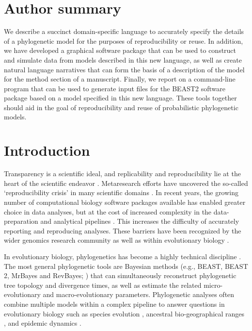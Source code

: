 \documentclass[10pt,letterpaper,table]{article}
\theoremstyle{definition}
\begin{document}
\section*{Author summary}
  We describe a succinct domain-specific language to accurately specify the details of a phylogenetic model for the purposes of reproducibility or reuse.
  In addition, we have developed a graphical software package that can be used to construct and simulate data from models described in this new language, as well as create natural language narratives that can form the basis of a description of the model for the method section of a manuscript.
  Finally, we report on a command-line program that can be used to generate input files for the BEAST2 software package based on a model specified in this new language.
  These tools together should aid in the goal of reproducibility and reuse of probabilistic phylogenetic models. 


\linenumbers

\section{Introduction}
Transparency is a scientific ideal, and replicability and
reproducibility lie at the heart of the scientific endeavor
\cite{nas19,munafo17}. 
Metaresearch efforts have uncovered the so-called `reproducibility
crisis' \cite{baker16} in many scientific domains \cite{baker16}. 
In recent years, the growing number of computational biology software packages available has enabled greater choice in data analyses, 
but at the cost of increased complexity in the data-preparation and analytical pipelines \cite{eren2021community}. 
This increases the difficulty of accurately reporting and reproducing analyses. 
These barriers have been recognized by the wider genomics research community \cite{eren2021community} as well as within evolutionary biology \cite{oakley2014osiris}. 

In evolutionary biology, phylogenetics has become a highly technical discipline \cite{oakley2014osiris}. 
The most general phylogenetic tools are Bayesian methods (e.g., BEAST, BEAST 2, MrBayes and
RevBayes; \cite{beast,beast2,revbayes,mrbayes}) 
that can simultaneously reconstruct phylogenetic tree topology and divergence times, as well as estimate the related micro-evolutionary and macro-evolutionary parameters. 
Phylogenetic analyses often combine multiple models within a complex pipeline to answer questions in evolutionary biology such as species evolution \cite{gavryushkina17,ogilvie21,zhang21}, 
ancestral bio-geographical ranges \cite{lemey10,landis18}, and epidemic dynamics \cite{faria21,douglas21}. 
\end{document}
